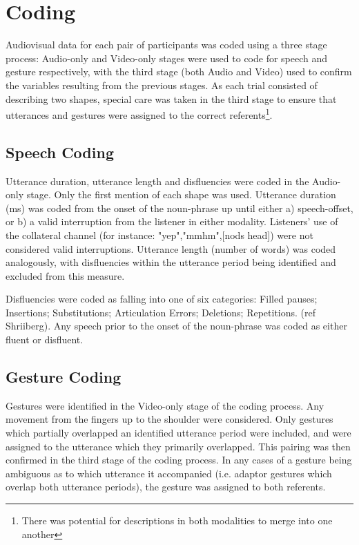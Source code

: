 \documentclass[a4paper,man,natbib]{apa6}
\begin{document}
\section{Coding}
Audiovisual data for each pair of participants was coded using a three stage process:
Audio-only and Video-only stages were used to code for speech and gesture respectively, with the third stage (both Audio and Video) used to confirm the variables resulting from the previous stages.
As each trial consisted of describing two shapes, special care was taken in the third stage to ensure that utterances and gestures were assigned to the correct referents\footnote{There was potential for descriptions in both modalities to merge into one another}.


\subsection{Speech Coding}
Utterance duration, utterance length and disfluencies were coded in the Audio-only stage.
Only the first mention of each shape was used. 
Utterance duration (ms) was coded from the onset of the noun-phrase up until either a) speech-offset, or b) a valid interruption from the listener in either modality.
Listeners' use of the collateral channel (for instance: "yep","mmhm",[nods head]) were not considered valid interruptions.
Utterance length (number of words) was coded analogously, with disfluencies within the utterance period being identified and excluded from this measure.

Disfluencies were coded as falling into one of six categories: Filled pauses; Insertions; Substitutions; Articulation Errors; Deletions; Repetitions. 
(ref Shriiberg).
Any speech prior to the onset of the noun-phrase was coded as either fluent or disfluent.




\subsection{Gesture Coding}
Gestures were identified in the Video-only stage of the coding process.
Any movement from the fingers up to the shoulder were considered. 
Only gestures which partially overlapped an identified utterance period were included, and were assigned to the utterance which they primarily overlapped. 
This pairing was then confirmed in the third stage of the coding process. 
In any cases of a gesture being ambiguous as to which utterance it accompanied (i.e. adaptor gestures which overlap both utterance periods), the gesture was assigned to both referents.
\end{document}
